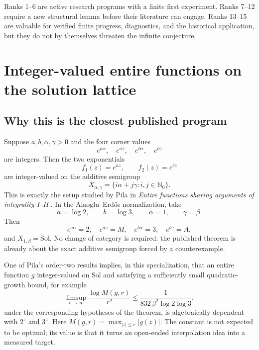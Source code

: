 \documentclass[10pt,letterpaper]{article}
\newcommand{\N}{\mathbb N}
\newcommand{\Sol}{\mathrm{Sol}}
\begin{document}
\endgroup

\begin{takeawaybox}
Ranks 1--6 are active research programs with a finite first experiment.  Ranks 7--12 require
a new structural lemma before their literature can engage.  Ranks 13--15 are valuable for
verified finite progress, diagnostics, and the historical application, but they do not by
themselves threaten the infinite conjecture.
\end{takeawaybox}

\section{Integer-valued entire functions on the solution lattice}
\label{sec:pila}

\subsection{Why this is the closest published program}

Suppose \(a,b,\alpha,\gamma>0\) and the four corner values
\[
  e^{a\alpha},\quad e^{a\gamma},\quad e^{b\alpha},\quad e^{b\gamma}
\]
are integers.  Then the two exponentials
\[
  f_1(z)=e^{az},\qquad f_2(z)=e^{bz}
\]
are integer-valued on the additive semigroup
\[
  X_{\alpha,\gamma}=\{i\alpha+j\gamma:i,j\in\N_0\}.
\]
This is exactly the setup studied by Pila in
\emph{Entire functions sharing arguments of integrality I--II}
\cite{PilaSharingI,PilaSharingII}.  In the Alaoglu--Erd\H{o}s normalization, take
\[
  a=\log2,\qquad b=\log3,\qquad \alpha=1,\qquad \gamma=\beta.
\]
Then
\[
  e^{a\alpha}=2,
  \quad e^{a\gamma}=M,
  \quad e^{b\alpha}=3,
  \quad e^{b\gamma}=A,
\]
and \(X_{1,\beta}=\Sol\).  No change of category is required: the published theorem is
already about the exact additive semigroup forced by a counterexample.

One of Pila's order-two results implies, in this specialization, that an entire function
\(g\) integer-valued on \(\Sol\) and satisfying a sufficiently small quadratic-growth bound,
for example
\begin{equation}
  \limsup_{r\to\infty}\frac{\log M(g,r)}{r^2}
  \leq \frac{1}{832\,\beta^2\log2\log3},
  \label{eq:pila-threshold}
\end{equation}
under the corresponding hypotheses of the theorem, is algebraically dependent with
\(2^z\) and \(3^z\).  Here \(M(g,r)=\max_{|z|\leq r}|g(z)|\).  The constant is not expected
to be optimal; its value is that it turns an open-ended interpolation idea into a measured
target.
\end{document}
